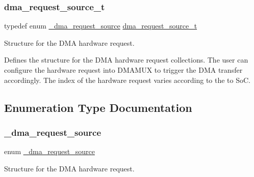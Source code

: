 \subsubsection{\texorpdfstring{dma\+\_\+request\+\_\+source\+\_\+t}{dma\_request\_source\_t}}
{\footnotesize\ttfamily typedef enum \mbox{\hyperlink{group__edma__request_gafd16b7227cfdebb996c941d293ddd600}{\+\_\+dma\+\_\+request\+\_\+source}}  \mbox{\hyperlink{group__edma__request_ga87fac76863c6c941e6363236dde6f58e}{dma\+\_\+request\+\_\+source\+\_\+t}}}



Structure for the D\+MA hardware request. 

Defines the structure for the D\+MA hardware request collections. The user can configure the hardware request into D\+M\+A\+M\+UX to trigger the D\+MA transfer accordingly. The index of the hardware request varies according to the to SoC. 

\subsection{Enumeration Type Documentation}
\mbox{\label{group__edma__request_gafd16b7227cfdebb996c941d293ddd600}} 
\subsubsection{\texorpdfstring{\+\_\+dma\+\_\+request\+\_\+source}{\_dma\_request\_source}}
{\footnotesize\ttfamily enum \mbox{\hyperlink{group__edma__request_gafd16b7227cfdebb996c941d293ddd600}{\+\_\+dma\+\_\+request\+\_\+source}}}



Structure for the D\+MA hardware request. 

